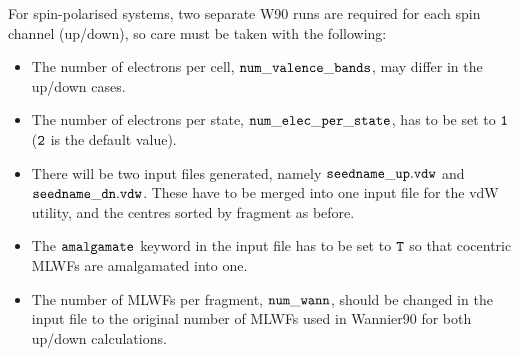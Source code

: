 \documentclass{report}
\begin{document}
For spin-polarised systems, two separate W90 runs are required for
each spin channel (up/down), so care must be taken with the following:

\begin{itemize}
\item The number of electrons per cell, $\tt{num\_valence\_bands}$,
may differ in the up/down cases.

\item The number of electrons per state, $\tt{num\_elec\_per\_state}$,
has to be set to $\tt{1}$ ($\tt{2}$ is the default value).

\item There will be two input files generated, namely
$\tt{seedname\_up.vdw}$ and $\tt{seedname\_dn.vdw}$.
These have to be merged into one input file for the
vdW utility, and the centres sorted by fragment as before.

\item The $\tt{amalgamate}$ keyword in the input file has to be set
to $\tt{T}$ so that cocentric MLWFs are amalgamated into one.

\item The number of MLWFs per fragment, $\tt{num\_wann}$, should
be changed in the input file to the original number of MLWFs used
in Wannier90 for both up/down calculations.
\end{itemize}
\end{document}
